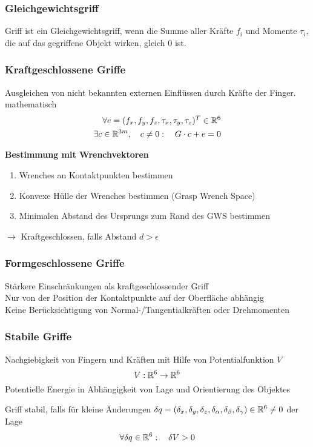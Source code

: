 \subsubsection{Gleichgewichtsgriff}
Griff ist ein Gleichgewichtsgriff, wenn die Summe aller Kräfte \(f_i\) und Momente \(\tau_i\), die auf das gegriffene
Objekt wirken, gleich \(0\) ist.

\subsubsection{Kraftgeschlossene Griffe}
Ausgleichen von nicht bekannten externen Einflüssen durch Kräfte der Finger.\\
mathematisch
\begin{align*}
  \forall e = (f_x, f_y, f_z, \tau_x, \tau_y, \tau_z)^T \in \mathbb{R}^6 \\
  \exists c \in \mathbb{R}^{3m}, \quad c \neq 0: \quad G \cdot c + e = 0
\end{align*}

\textbf{Bestimmung mit Wrenchvektoren}
\begin{enumerate}
\item Wrenches an Kontaktpunkten bestimmen
\item Konvexe Hülle der Wrenches bestimmen (Grasp Wrench Space)
\item Minimalen Abstand des Ursprungs zum Rand des GWS bestimmen
\end{enumerate}
\(\rightarrow\) Kraftgeschlossen, falls Abstand \(d > \epsilon\)

\subsubsection{Formgeschlossene Griffe}
Stärkere Einschränkungen als kraftgeschlossender Griff\\
Nur von der Position der Kontaktpunkte auf der Oberfläche abhängig\\
Keine Berücksichtigung von Normal-/Tangentialkräften oder Drehmomenten

\subsubsection{Stabile Griffe}
Nachgiebigkeit von Fingern und Kräften mit Hilfe von Potentialfunktion \(V\)
\[V : \mathbb{R}^6 \rightarrow \mathbb{R}^6\]
Potentielle Energie in Abhängigkeit von Lage und Orientierung des Objektes

Griff stabil, falls für kleine Änderungen \(\delta q = (\delta_x, \delta_y, \delta_z, \delta_\alpha,\delta_\beta, \delta_\gamma) \in
\mathbb{R}^6 \neq 0\) der Lage
\[\forall \delta q \in \mathbb{R}^6: \quad \delta V > 0\]

